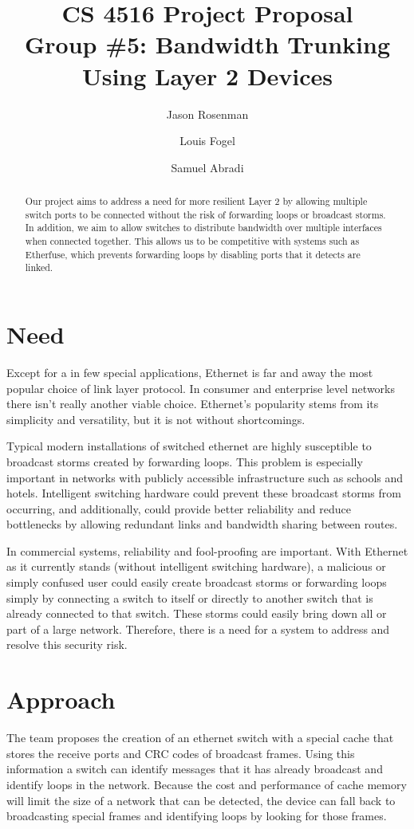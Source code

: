 \documentclass{article}
\title{CS 4516 Project Proposal\\Group \#5: Bandwidth Trunking Using Layer 2 Devices}
\author{Jason Rosenman \and Louis Fogel \and Samuel Abradi}
\date{}
\begin{document}
\maketitle
\begin{abstract}
	Our project aims to address a need for more resilient Layer 2 by allowing multiple switch ports to be connected without the risk of forwarding loops or broadcast storms.
	In addition, we aim to allow switches to distribute bandwidth over multiple interfaces when connected together.
	This allows us to be competitive with systems such as Etherfuse, which prevents forwarding loops by disabling ports that it detects are linked.
\end{abstract}
\section{Need}
	Except for a in few special applications, Ethernet is far and away the most popular choice of link layer protocol.
	In consumer and enterprise level networks there isn’t really another viable choice.
	Ethernet’s popularity stems from its simplicity and versatility, but it is not without shortcomings.

	Typical modern installations of switched ethernet are highly susceptible to broadcast storms created by forwarding loops.
	This problem is especially important in networks with publicly accessible infrastructure such as schools and hotels.
	Intelligent switching hardware could prevent these broadcast storms from occurring, and additionally, could provide better reliability and reduce bottlenecks by allowing redundant links and bandwidth sharing between routes.
	
	In commercial systems, reliability and fool-proofing are important.
	With Ethernet as it currently stands (without intelligent switching hardware), a malicious or simply confused user could easily create broadcast storms or forwarding loops simply by connecting a switch to itself or directly to another switch that is already connected to that switch.
	These storms could easily bring down all or part of a large network.
	Therefore, there is a need for a system to address and resolve this security risk.
\section{Approach}
	The team proposes the creation of an ethernet switch with a special cache that stores the receive ports and CRC codes of broadcast frames.
	Using this information a switch can identify messages that it has already broadcast and identify loops in the network.
	Because the cost and performance of cache memory will limit the size of a network that can be detected, the device can fall back to broadcasting special frames and identifying loops by looking for those frames.
\end{document}
